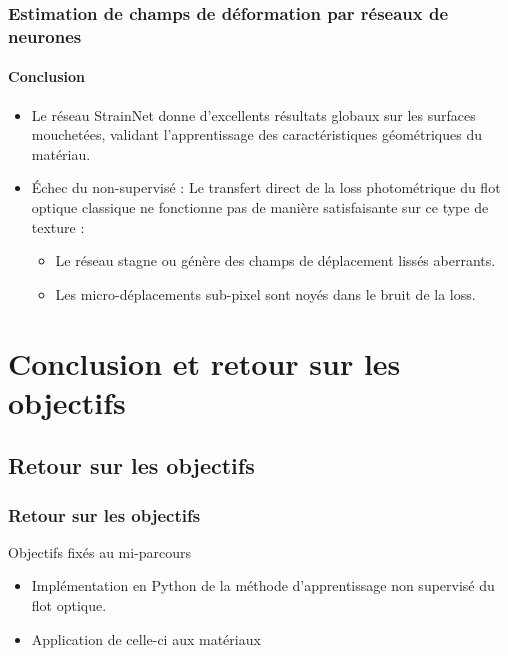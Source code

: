 \documentclass[aspectratio=169]{beamer}
\newcommand{\1}{\mathbf{1}}
\begin{document}
\begin{frame}
\frametitle{Estimation de champs de déformation par réseaux de neurones}
\framesubtitle{Conclusion}
\begin{itemize}
        \item Le réseau StrainNet donne d'excellents résultats globaux sur les surfaces mouchetées, validant l'apprentissage des caractéristiques géométriques du matériau.
        \pause
        \item Échec du non-supervisé : Le transfert direct de la loss photométrique du flot optique classique ne fonctionne pas de manière satisfaisante sur ce type de texture :
        \pause
        \begin{itemize}
            \item Le réseau stagne ou génère des champs de déplacement lissés aberrants.
            \pause
            \item Les micro-déplacements sub-pixel sont noyés dans le bruit de la loss.
        \end{itemize}
    \end{itemize}
\end{frame}

\section{Conclusion et retour sur les objectifs}
\subsection{Retour sur les objectifs}
\begin{frame}
    \frametitle{Retour sur les objectifs}
    Objectifs fixés au mi-parcours
    \begin{itemize}
        \item Implémentation en Python de la méthode d'apprentissage non supervisé du flot optique.
        \item Application de celle-ci aux matériaux
    \end{itemize}

\end{frame}
\end{document}
